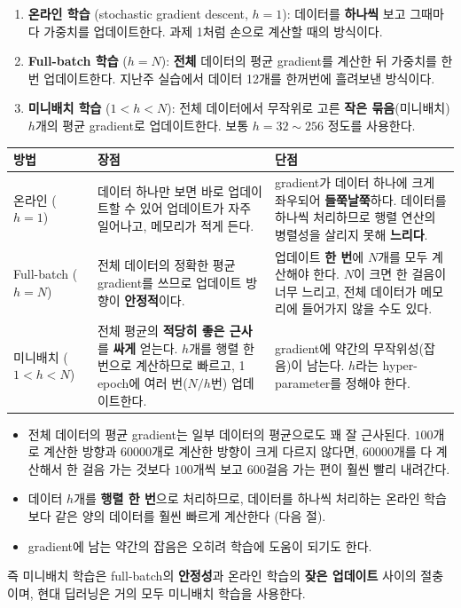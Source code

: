 \documentclass[11pt,a4paper]{article}
\begin{document}
\begin{enumerate}[leftmargin=1.8em]
\item \textbf{온라인 학습} (stochastic gradient descent, $h=1$):
데이터를 \textbf{하나씩} 보고 그때마다 가중치를 업데이트한다.
과제 1처럼 손으로 계산할 때의 방식이다.
\item \textbf{Full-batch 학습} ($h=N$):
\textbf{전체} 데이터의 평균 gradient를 계산한 뒤 가중치를 한 번 업데이트한다.
지난주 실습에서 데이터 12개를 한꺼번에 흘려보낸 방식이다.
\item \textbf{미니배치 학습} ($1<h<N$):
전체 데이터에서 무작위로 고른 \textbf{작은 묶음}(미니배치) $h$개의 평균 gradient로 업데이트한다.
보통 $h=32\sim256$ 정도를 사용한다.
\end{enumerate}

\begin{center}
\begin{tabular}{@{}p{}p{}p{}@{}}
\toprule
방법 & 장점 & 단점 \\
\midrule
온라인 ($h=1$)
& 데이터 하나만 보면 바로 업데이트할 수 있어 업데이트가 자주 일어나고, 메모리가 적게 든다.
& gradient가 데이터 하나에 크게 좌우되어 \textbf{들쭉날쭉}하다.
데이터를 하나씩 처리하므로 행렬 연산의 병렬성을 살리지 못해 \textbf{느리다}. \\[3pt]
Full-batch ($h=N$)
& 전체 데이터의 정확한 평균 gradient를 쓰므로 업데이트 방향이 \textbf{안정적}이다.
& 업데이트 \textbf{한 번}에 $N$개를 모두 계산해야 한다.
$N$이 크면 한 걸음이 너무 느리고, 전체 데이터가 메모리에 들어가지 않을 수도 있다. \\[3pt]
미니배치 ($1<h<N$)
& 전체 평균의 \textbf{적당히 좋은 근사}를 \textbf{싸게} 얻는다.
$h$개를 행렬 한 번으로 계산하므로 빠르고, 1 epoch에 여러 번($N/h$번) 업데이트한다.
& gradient에 약간의 무작위성(잡음)이 남는다.
$h$라는 hyper-parameter를 정해야 한다. \\
\bottomrule
\end{tabular}
\end{center}

\begin{keybox}
\begin{itemize}[leftmargin=1.8em]
\item 전체 데이터의 평균 gradient는 일부 데이터의 평균으로도 꽤 잘 근사된다.
$100$개로 계산한 방향과 $60000$개로 계산한 방향이 크게 다르지 않다면,
$60000$개를 다 계산해서 한 걸음 가는 것보다 $100$개씩 보고 $600$걸음 가는 편이 훨씬 빨리 내려간다.
\item 데이터 $h$개를 \textbf{행렬 한 번}으로 처리하므로,
데이터를 하나씩 처리하는 온라인 학습보다 같은 양의 데이터를 훨씬 빠르게 계산한다 (다음 절).
\item gradient에 남는 약간의 잡음은 오히려 학습에 도움이 되기도 한다.
\end{itemize}
즉 미니배치 학습은 full-batch의 \textbf{안정성}과 온라인 학습의 \textbf{잦은 업데이트} 사이의 절충이며,
현대 딥러닝은 거의 모두 미니배치 학습을 사용한다.
\end{keybox}
\end{document}
